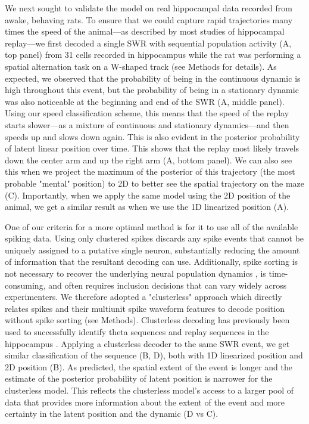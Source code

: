 \documentclass[9pt,lineno]{elife}
\begin{document}
We next sought to validate the model on real hippocampal data recorded from awake, behaving rats. To ensure that we could capture rapid trajectories many times the speed of the animal---as described by most studies of hippocampal replay---we first decoded a single SWR with sequential population activity (A, top panel) from 31 cells recorded in hippocampus while the rat was performing a spatial alternation task on a W-shaped track (see Methods for details). As expected, we observed that the probability of being in the continuous dynamic is high throughout this event, but the probability of being in a stationary dynamic was also noticeable at the beginning and end of the SWR (A, middle panel). Using our speed classification scheme, this means that the speed of the replay starts slower---as a mixture of continuous and stationary dynamics---and then speeds up and slows down again. This is also evident in the posterior probability of latent linear position over time. This shows that the replay most likely travels down the center arm and up the right arm (A, bottom panel). We can also see this when we project the maximum of the posterior of this trajectory (the most probable "mental" position) to 2D to better see the spatial trajectory on the maze (C). Importantly, when we apply the same model using the 2D position of the animal, we get a similar result as when we use the 1D linearized position (A).

One of our criteria for a more optimal method is for it to use all of the available spiking data. Using only clustered spikes discards any spike events that cannot be uniquely assigned to a putative single neuron, substantially reducing the amount of information that the resultant decoding can use. Additionally, spike sorting is not necessary to recover the underlying neural population dynamics \citep{TrautmannAccurateEstimationNeural2019}, is time-consuming, and often requires inclusion decisions that can vary widely across experimenters. We therefore adopted a "clusterless" approach which directly relates spikes and their multiunit spike waveform features to decode position without spike sorting (see Methods). Clusterless decoding has previously been used to successfully identify theta sequences and replay sequences in the hippocampus \citep{KloostermanBayesiandecodingusing2014, ChenTransductiveneuraldecoding2012,DengRapidclassificationhippocampal2016, KayConstantSubsecondCycling2020}. Applying a clusterless decoder to the same SWR event, we get similar classification of the sequence (B, D), both with 1D linearized position and 2D position (B). As predicted, the spatial extent of the event is longer and the estimate of the posterior probability of latent position is narrower for the clusterless model. This reflects the clusterless model's access to a larger pool of data that provides more information about the extent of the event and more certainty in the latent position and the dynamic (D vs C).
\end{document}

